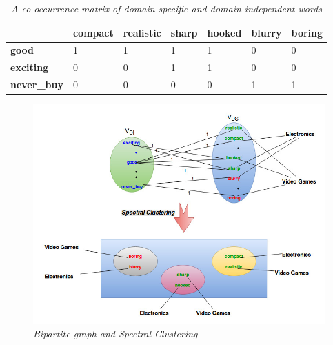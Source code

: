 \documentclass{report}
\begin{document}
\begin{table}[!h]
\begin{center}
\label{my-label}
\begin{tabular}{|p{2cm}|p{2cm}|p{2cm}|p{2cm}|p{2cm}|p{2cm}|p{2cm}|}
\hline
                    & \large\textbf{compact} & \large\textbf{realistic} & \large\textbf{sharp} & \large\textbf{hooked} & \large\textbf{blurry} & \large\textbf{boring} \\ \hline
\large\textbf{good}       \large & 1               \large & 1                 \large & 1             \large & 1               & 0               & 0               \\ \hline
\large\textbf{exciting}   & 0                & 0                  & 1              & 1               & 0               & 0               \\ \hline
\large\textbf{never\_buy} & 0                & 0                  & 0              & 0               & 1               & 1               \\ \hline
\end{tabular}
\end{center}
\caption{\textit{A co-occurrence matrix of domain-specific and domain-independent words}}

\end{table}

\begin{figure}[!h]
	\includegraphics[width=\linewidth]{SpectralClustering.jpg}
	\caption{\textit{Bipartite graph and Spectral Clustering\cite{Pan:2010:CSC:1772690.1772767}}}
	\label{Fig:2}
\end{figure}
\end{document}
